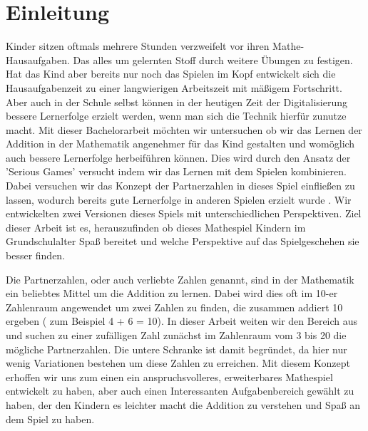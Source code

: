 
\chapter{Einleitung}
Kinder sitzen oftmals mehrere Stunden verzweifelt vor ihren Mathe-Hausaufgaben. Das alles um gelernten Stoff durch weitere Übungen zu festigen. Hat das Kind aber bereits nur noch das Spielen im Kopf entwickelt sich die Hausaufgabenzeit zu einer langwierigen Arbeitszeit mit mäßigem Fortschritt. Aber auch in der Schule selbst können in der heutigen Zeit der Digitalisierung bessere Lernerfolge erzielt werden, wenn man sich die Technik hierfür zunutze macht. Mit dieser Bachelorarbeit möchten wir untersuchen ob wir das Lernen der Addition in der Mathematik angenehmer für das Kind gestalten und womöglich auch bessere Lernerfolge herbeiführen können. Dies wird durch den Ansatz der 'Serious Games' versucht indem wir das Lernen mit dem Spielen kombinieren. Dabei versuchen wir das Konzept der Partnerzahlen in dieses Spiel einfließen zu lassen, wodurch bereits gute Lernerfolge in anderen Spielen erzielt wurde \cite{Jung2016}. Wir entwickelten zwei Versionen dieses Spiels mit unterschiedlichen Perspektiven. Ziel dieser Arbeit ist es, herauszufinden ob dieses Mathespiel Kindern im Grundschulalter Spaß bereitet und welche Perspektive auf das Spielgeschehen sie besser finden.

Die Partnerzahlen, oder auch verliebte Zahlen genannt, sind in der Mathematik ein beliebtes Mittel um die Addition zu lernen. Dabei wird dies oft im 10-er Zahlenraum angewendet um zwei Zahlen zu finden, die zusammen addiert 10 ergeben ( zum Beispiel 4 + 6 = 10). In dieser Arbeit weiten wir den Bereich aus und suchen zu einer zufälligen Zahl zunächst im Zahlenraum vom 3 bis 20 die mögliche Partnerzahlen. Die untere Schranke ist damit begründet, da hier nur wenig Variationen bestehen um diese Zahlen zu erreichen. Mit diesem Konzept erhoffen wir uns zum einen ein anspruchsvolleres, erweiterbares Mathespiel entwickelt zu haben, aber auch einen Interessanten Aufgabenbereich gewählt zu haben, der den Kindern es leichter macht die Addition zu verstehen und Spaß an dem Spiel zu haben.

